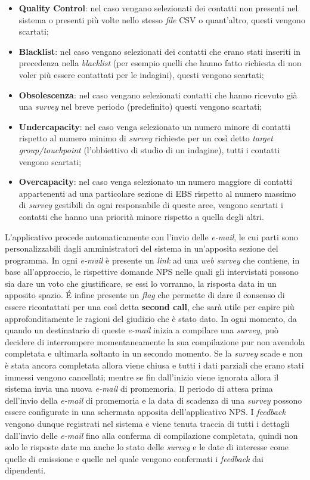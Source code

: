 \begin{itemize}
\item \textbf{Quality Control}: nel caso vengano selezionati dei contatti non presenti nel sistema o presenti più volte nello stesso \textit{file} CSV o quant'altro, questi vengono scartati;
\item \textbf{Blacklist}: nel caso vengano selezionati dei contatti che erano stati inseriti in precedenza nella \textit{blacklist} (per esempio quelli che hanno fatto richiesta di non voler più essere contattati per le indagini), questi vengono scartati;
\item \textbf{Obsolescenza}: nel caso vengano selezionati contatti che hanno ricevuto già una \textit{survey} nel breve periodo (predefinito) questi vengono scartati;
\item \textbf{Undercapacity}: nel caso venga selezionato un numero minore di contatti rispetto al numero minimo di \textit{survey} richieste per un così detto \textit{target group/touchpoint} (l'obbiettivo di studio di un indagine), tutti i contatti vengono scartati;
\item \textbf{Overcapacity}: nel caso venga selezionato un numero maggiore di contatti appartenenti ad una particolare sezione di EBS 
rispetto al numero massimo di \textit{survey} gestibili da ogni responsabile di queste aree, vengono scartati i contatti che hanno una priorità minore rispetto a quella degli altri.
\end{itemize}
L'applicativo procede automaticamente con l'invio delle \textit{e-mail}, le cui parti sono personalizzabili dagli amministratori del sistema in un'apposita sezione del programma. In ogni \textit{e-mail} è presente un \textit{link} ad una \textit{web survey} che contiene, in base all'approccio, le rispettive domande NPS nelle quali gli intervistati possono sia dare un voto che giustificare, se essi lo vorranno, la risposta data in un apposito spazio. \'E infine presente un \textit{flag} che permette di dare il consenso di essere ricontattati per una così detta \textbf{second call}, che sarà utile per capire più approfonditamente le ragioni del giudizio che è stato dato.
In ogni momento, da quando un destinatario di queste \textit{e-mail} inizia a compilare una \textit{survey}, può decidere di interrompere momentaneamente la sua compilazione pur non avendola completata e ultimarla soltanto in un secondo momento. Se la \textit{survey} scade e non è stata ancora completata allora viene chiusa e tutti i dati parziali che erano stati immessi vengono cancellati; mentre se fin dall'inizio viene ignorata allora il sistema invia una nuova \textit{e-mail} di promemoria. Il periodo di attesa prima dell'invio della \textit{e-mail} di promemoria e la data di scadenza di una \textit{survey} possono essere configurate in una schermata apposita dell'applicativo NPS. I \textit{feedback} vengono dunque registrati nel sistema e viene tenuta traccia di tutti i dettagli dall'invio delle \textit{e-mail} fino alla conferma di compilazione completata, quindi non solo le risposte date ma anche lo stato delle \textit{survey} e le date di interesse come quelle di emissione e quelle nel quale vengono confermati i \textit{feedback} dai dipendenti.\\
